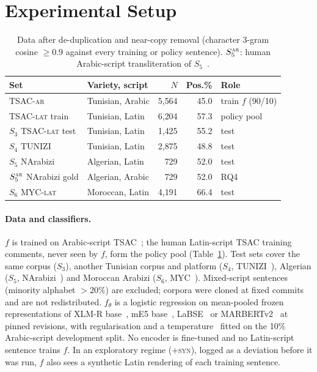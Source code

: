 \section{Experimental Setup}
\label{sec:setup}

\begin{table}[t]
\centering
\caption{Data after de-duplication and near-copy removal (character 3-gram cosine $\ge0.9$ against every training or policy sentence). $S_5^{\textsc{ar}}$: human Arabic-script transliteration of $S_5$~\cite{touileb2021interplay}.}
\label{tab:data}
\footnotesize\setlength{\tabcolsep}{4pt}
\begin{tabular}{@{}llrrl@{}}
\toprule
Set & Variety, script & $N$ & Pos.\% & Role\\
\midrule
TSAC-\textsc{ar} & Tunisian, Arabic & 5{,}564 & 45.0 & train $f$ (90/10)\\
TSAC-\textsc{lat} train & Tunisian, Latin & 6{,}204 & 57.3 & policy pool\\
$S_3$ TSAC-\textsc{lat} test & Tunisian, Latin & 1{,}425 & 55.2 & test\\
$S_4$ TUNIZI & Tunisian, Latin & 2{,}875 & 48.8 & test\\
$S_5$ NArabizi & Algerian, Latin & 729 & 52.0 & test\\
$S_5^{\textsc{ar}}$ NArabizi gold & Algerian, Arabic & 729 & 52.0 & RQ4\\
$S_6$ MYC-\textsc{lat} & Moroccan, Latin & 4{,}191 & 66.4 & test\\
\bottomrule
\end{tabular}
\end{table}

\paragraph{Data and classifiers.}
$f$ is trained on Arabic-script TSAC~\cite{medhaffar2017tsac}; the human Latin-script TSAC training comments, never seen by $f$, form the policy pool (Table~\ref{tab:data}). Test sets cover the same corpus ($S_3$), another Tunisian corpus and platform ($S_4$, TUNIZI~\cite{fourati2021tunizi}), Algerian ($S_5$, NArabizi~\cite{seddah2020narabizi,touileb2021interplay}) and Moroccan Arabizi ($S_6$, MYC~\cite{jbel2023myc}). Mixed-script sentences (minority alphabet $>20\%$) are excluded; corpora were cloned at fixed commits and are not redistributed. $f_\theta$ is a logistic regression on mean-pooled frozen representations of XLM-R base~\cite{conneau2020xlmr}, mE5 base~\cite{wang2024me5}, LaBSE~\cite{feng2022labse} or MARBERTv2~\cite{abdulmageed2021marbert} at pinned revisions, with regularisation and a temperature~\cite{guo2017calibration} fitted on the 10\% Arabic-script development split. No encoder is fine-tuned and no Latin-script sentence trains $f$. In an exploratory regime (\textsc{+syn}), logged as a deviation before it was run, $f$ also sees a synthetic Latin rendering of each training sentence.

